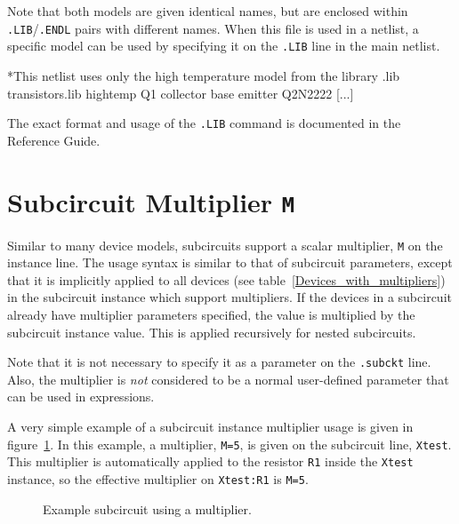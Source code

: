Note that both models are given identical names, but are enclosed
within \texttt{.LIB}/\texttt{.ENDL} pairs with different names.  When
this file is used in a netlist, a specific model can be used by
specifying it on the \texttt{.LIB} line in the main netlist.

\begin{vquote}
*This netlist uses only the high temperature model from the library
.lib transistors.lib hightemp
Q1 collector base emitter Q2N2222
[...]
\end{vquote}

The exact format and usage of the \texttt{.LIB} command is documented in the
\Xyce{} Reference Guide\ReferenceGuide{}.

\section{Subcircuit Multiplier \texttt{M}}
\label{subcircuit_multiplier}

Similar to many device models, subcircuits support a scalar multiplier, \texttt{M} on the instance line.
The usage syntax is similar to that of subcircuit parameters, except that it is 
implicitly applied to all devices (see table~\ref{Devices_with_multipliers}) in 
the subcircuit instance which support multipliers.
If the devices in a subcircuit already have multiplier parameters specified, 
the value is multiplied by the subcircuit instance value.  This is applied recursively 
for nested subcircuits.

Note that it is not necessary to specify it as a parameter on the \texttt{.subckt} line.  
Also, the multiplier is \emph{not} considered to be a normal user-defined parameter that can be 
used in expressions.

A very simple example of a subcircuit instance multiplier usage is given in figure~\ref{Subcircuit_Multiplier_Example_1}.  In this example, a multiplier, \texttt{M=5}, is given on the subcircuit line, \texttt{Xtest}.   This multiplier is automatically applied to the resistor \texttt{R1} inside the \texttt{Xtest} instance, so the effective multiplier on \texttt{Xtest:R1} is \texttt{M=5}.
\begin{figure}[H]
\begin{centering}
\caption{Example subcircuit using a multiplier.\label{Subcircuit_Multiplier_Example_1}}
\end{centering}
\end{figure}

